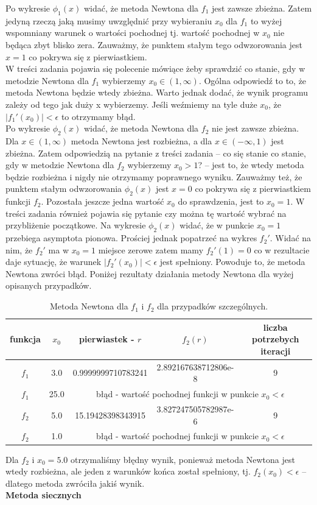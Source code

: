 \documentclass[]{article}
\begin{document}
	Po wykresie $\phi_1(x)$ widać, że metoda Newtona dla $f_1$ jest zawsze zbieżna. Zatem jedyną rzeczą jaką musimy uwzględnić przy wybieraniu $x_0$ dla $f_1$ to wyżej wspomniany warunek o wartości pochodnej tj. wartość pochodnej w $x_0$ nie będąca zbyt blisko zera. Zauważmy, że punktem stałym tego odwzorowania jest $x=1$ co pokrywa się z pierwiastkiem.\\
	W treści zadania pojawia się polecenie mówiące żeby sprawdzić co stanie, gdy w metodzie Newtona dla $f_1$ wybierzemy $x_0\in(1,\infty)$. Ogólna odpowiedź to to, że metoda Newtona będzie wtedy zbieżna. Warto jednak dodać, że wynik programu zależy od tego jak duży x wybierzemy. Jeśli weźmiemy na tyle duże $x_0$, że $|f_1'(x_0)|<\epsilon$ to otrzymamy błąd.\\
	Po wykresie $\phi_2(x)$ widać, że metoda Newtona dla $f_2$ nie jest zawsze zbieżna. Dla $x\in(1,\infty)$ metoda Newtona jest rozbieżna, a dla $x\in(-\infty, 1)$ jest zbieżna. Zatem odpowiedzią na pytanie z treści zadania -- co się stanie co stanie, gdy w metodzie Newtona dla $f_2$ wybierzemy $x_0>1$? -- jest to, że wtedy metoda będzie rozbieżna i nigdy nie otrzymamy poprawnego wyniku. Zauważmy też, że punktem stałym odwzorowania $\phi_2(x)$ jest $x=0$ co pokrywa się z pierwiastkiem funkcji $f_2$. Pozostała jeszcze jedna wartość $x_0$ do sprawdzenia, jest to $x_0=1$. W treści zadania również pojawia się pytanie czy można tę wartość wybrać na przybliżenie początkowe.
	Na wykresie $\phi_2(x)$ widać, że w punkcie $x_0 = 1$ przebiega asymptota pionowa. Prościej jednak popatrzeć na wykres $f_2'$. Widać na nim, że $f_2'$ ma w $x_0=1$ miejsce zerowe zatem mamy $f_2'(1) =0$ co w rezultacie daje sytuację, że warunek $|f_2'(x_0)|<\epsilon$ jest spełniony. Powoduje to, że metoda Newtona zwróci błąd. Poniżej rezultaty działania metody Newtona dla wyżej opisanych przypadków.
	\begin{table}[!h]
		\centering
		\label{tab:table1}
		\begin{tabular}{|c|c|c|c|c|}
			\hline
			funkcja & $x_0$ & pierwiastek - $r$ & $f_2(r)$ & liczba potrzebych iteracji\\
			\hline
			$f_1$ & 3.0 & 0.9999999710783241 & 2.892167638712806e-8 & 9\\ \hline
			$f_1$ & 25.0 & \multicolumn{3}{|c|}{błąd - wartość pochodnej funkcji w punkcie $x_0<\epsilon$ } \\ \hline
			$f_2$ & 5.0 & 15.19428398343915 & 3.827247505782987e-6 & 9\\  \hline
			$f_2$ & 1.0 & \multicolumn{3}{|c|}{błąd - wartość pochodnej funkcji w punkcie $x_0<\epsilon$ } \\ \hline
		\end{tabular}
		\caption*{Metoda Newtona dla $f_1$ i $f_2$ dla przypadków szczególnych.}
	\end{table}
	
	\noindent Dla $f_2$ i $x_0=5.0$ otrzymaliśmy błędny wynik, ponieważ metoda Newtona jest wtedy rozbieżna, ale jeden z warunków końca został spełniony, tj. $f_2(x_0) < \epsilon$ -- dlatego metoda zwróciła jakiś wynik.\\
	\textbf{Metoda siecznych}\\
	
	
\end{document}
